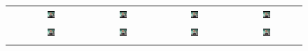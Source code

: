 \begin{figure}
    \centering
    \setlength{\belowcaptionskip}{-6pt}
    \setlength{\tabcolsep}{0.5pt}
    {
    \begin{tabular}{ccccc}
        
        \vspace{-0.0615cm}
        
        \raisebox{0.15in}{\rotatebox{90}{Original}} &
        \includegraphics[width=0.11\textwidth]{resources/images/OOD/source_0006.jpeg} &
         \includegraphics[width=0.11\textwidth]{resources/images/OOD/source_0035.jpeg} &
        \includegraphics[width=0.11\textwidth]{resources/images/OOD/source_0054.jpeg} &                \includegraphics[width=0.11\textwidth]{resources/images/OOD/source_0071.jpeg} \\
        
        \raisebox{0.18in}{\rotatebox{90}{$+Smile$}} &
        \includegraphics[width=0.11\textwidth]{resources/images/OOD/edit_0006.jpeg} &
        \includegraphics[width=0.11\textwidth]{resources/images/OOD/edit_0035.jpeg} &
        \includegraphics[width=0.11\textwidth]{resources/images/OOD/edit_0054.jpeg} &
        \includegraphics[width=0.11\textwidth]{resources/images/OOD/edit_0071.jpeg} \\ \\
        

\end{tabular}}
\end{figure}
